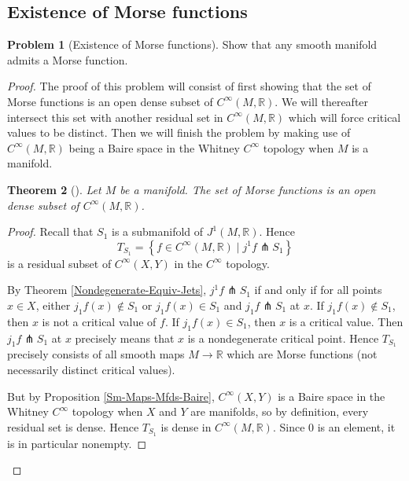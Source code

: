 \documentclass[reqno]{amsart}
\newtheorem{theorem}{Theorem}[section]
\theoremstyle{definition}
\newtheorem{problem}[theorem]{Problem}
\theoremstyle{remark}
\begin{document}
    \subsection{Existence of Morse functions}



 \begin{problem}[Existence of Morse functions]
     Show that any smooth manifold admits a Morse function.
 \end{problem}

 \begin{proof}
     
 The proof of this problem will
 consist of first showing that
 the set of Morse functions is an open dense
 subset of $C^{\infty}(M,\mathbb{R})$. We will
 thereafter intersect this set with another residual
 set in $C^{\infty}(M,\mathbb{R})$ which will force
 critical values to be distinct. Then
 we will finish the problem by making use of
 $C^{\infty}(M,\mathbb{R})$ being a Baire space in
 the Whitney $C^{\infty}$ topology when
 $M$ is a manifold.



 \begin{theorem}[]\label{Morse-Functions-Open-Dense}
         Let $M$ be a manifold. The set of Morse
         functions is an open dense subset of
         $C^{\infty}(M,\mathbb{R})$.
     \end{theorem}

 \begin{proof}


     Recall that $S_1 $ is a submanifold of
     $J^{1}(M, \mathbb{R})$.
     Hence
     \[
     T_{S_1} =
     \left\{ f \in C^{\infty}(M,\mathbb{R})
      \mid j^{1}f \pitchfork S_1 \right\}
     \]
     is a residual subset of
     $C^{\infty}(X,Y)$ in the $C^{\infty}$ topology.

     By Theorem \ref{Nondegenerate-Equiv-Jets},
     $j^{1}f \pitchfork S_1$ if and only if
     for all points
     $x \in X$, either
     $j_1f (x) \not\in S_1$ or
     $j_1f(x) \in S_1$ and
     $j_1f \pitchfork S_1$ at $x$.
     If $j_1f(x) \not\in S_1$, then
     $x$ is not a critical value of $f$.
     If $j_1f(x) \in S_1$, then
     $x$ is a critical value. Then
     $j_1f \pitchfork S_1$ at $x$ precisely means
     that $x$ is a nondegenerate critical point.
     Hence
     $T_{S_1}$ precisely consists of all
     smooth maps $M \to \mathbb{R}$ which are Morse functions
     (not necessarily distinct critical values).

     But by Proposition \ref{Sm-Maps-Mfds-Baire},
     $C^{\infty}(X,Y)$ is a Baire space in the
     Whitney $C^{\infty}$ topology when
     $X$ and $Y$ are manifolds, so by
     definition, every residual set is dense. Hence
     $T_{S_1}$ is dense in
     $C^{\infty}(M,\mathbb{R})$. Since
     $0$ is an element, it is in particular nonempty.


\end{proof}
\end{proof}
\end{document}
